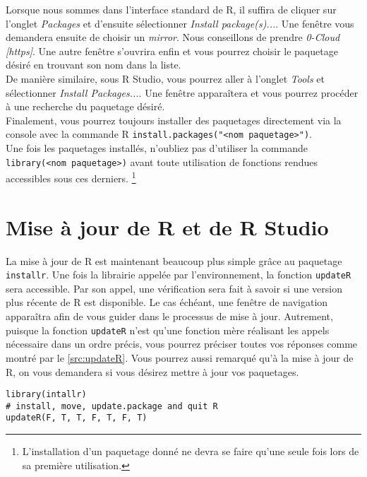 Lorsque nous sommes dans l'interface standard de R, il suffira de cliquer sur l'onglet \emph{Packages} et d'ensuite sélectionner \emph{Install package(s)...}. Une fenêtre vous demandera ensuite de choisir un \emph{mirror}. Nous conseillons de prendre \emph{0-Cloud [https]}. Une autre fenêtre s'ouvrira enfin et vous pourrez choisir le paquetage désiré en trouvant son nom dans la liste. \\

De manière similaire, sous R Studio, vous pourrez aller à l'onglet \emph{Tools} et sélectionner \emph{Install Packages...}. Une fenêtre apparaîtera et vous pourrez procéder à une recherche du paquetage désiré. \\

Finalement, vous pourrez toujours installer des paquetages directement via la console avec la commande R \texttt{install.packages("<nom paquetage>")}. \\

Une fois les paquetages installés, n'oubliez pas d'utiliser la commande \texttt{library(<nom paquetage>)} avant toute utilisation de fonctions rendues accessibles sous ces derniers. \footnote{L'installation d'un paquetage donné ne devra se faire qu'une seule fois lors de sa première utilisation.}

\section{Mise à jour de R et de R Studio}
La mise à jour de R est maintenant beaucoup plus simple grâce au paquetage \texttt{installr}. Une fois la librairie appelée par l'environnement, la fonction \texttt{updateR} sera accessible. Par son appel, une vérification sera fait à savoir si une version plus récente de R est disponible. Le cas échéant, une fenêtre de navigation apparaîtra afin de vous guider dans le processus de mise à jour. Autrement, puisque la fonction \texttt{updateR} n'est qu'une fonction mère réalisant les appels nécessaire dans un ordre précis, vous pourrez préciser toutes vos réponses comme montré par le \autoref{src:updateR}. Vous pourrez aussi remarqué qu'à la mise à jour de R, on vous demandera si vous désirez mettre à jour vos paquetages. \cite{updateR} \\

\begin{lstlisting}[caption = Mise à jour de R avec la fonction \texttt{updateR},label=src:updateR]
library(intallr)
# install, move, update.package and quit R
updateR(F, T, T, F, T, F, T)
\end{lstlisting}

